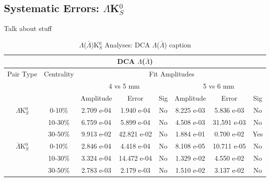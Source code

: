 \documentclass[../AnalysisNoteJBuxton.tex]{subfiles}
\begin{document}
\subsection{Systematic Errors: \texorpdfstring{$\Lambda$K$^{0}_{S}$}{TEXT}}
\label{SysErrsLamK0}

Talk about stuff

\begin{table}
 \centering
 \begin{tabular}{|c|c|c|c|c||c|c|c|}
  \multicolumn{8}{c}{DCA $\Lambda$($\bar{\Lambda}$)} \\
  \hline
  \multirow{2}{*}{Pair Type} & \multirow{2}{*}{Centrality} & \multicolumn{6}{c|}{Fit Amplitudes} \\
  \cline{3-8}
   & & \multicolumn{3}{c||}{4 vs 5 mm} & \multicolumn{3}{c|}{5 vs 6 mm} \\
  \hline
   & & Amplitude & Error & Sig & Amplitude & Error & Sig \\
  \hline  
  \multirow{3}{*}{$\Lambda$K$^{0}_{S}$}  
   &  0-10\% & 2.709 e-04 & 1.940 e-04 & No & 8.225 e-03 & 5.836 e-03 & No \\
   & 10-30\% & 6.759 e-04 & 5.899 e-04 & No & 4.508 e-03 & 31.591 e-03 & No \\
   & 30-50\% & 9.913 e-02 & 42.821 e-02 & No & 1.884 e-01 & 0.700 e-02 & Yes\\
  \hline  
  \multirow{3}{*}{$\bar{\Lambda}$K$^{0}_{S}$}  
   &  0-10\% & 2.846 e-04 & 4.418 e-04 & No & 8.108 e-05 & 10.711 e-05 & No \\
   & 10-30\% & 3.324 e-04 & 14.472 e-04 & No & 1.329 e-02 & 4.550 e-02 & No \\
   & 30-50\% & 2.783 e-03 & 2.179 e-03 & No & 1.510 e-02 & 3.137 e-02 & No \\ 
  \hline
 \end{tabular}
 \caption{$\Lambda$($\bar{\Lambda}$)K$^{0}_{S}$ Analyses: DCA $\Lambda$($\bar{\Lambda}$) caption}
 \label{tab:LamDcaLamK0}
\end{table}
\end{document}
